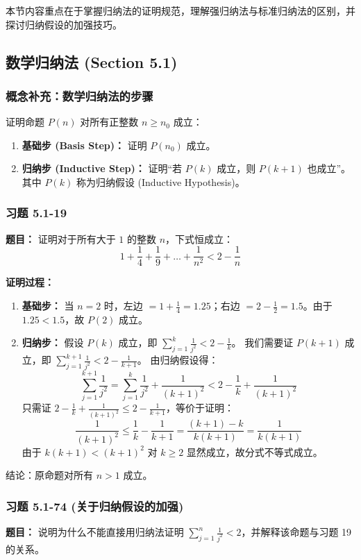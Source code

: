 \documentclass[11pt,UTF8]{article}
\begin{document}
本节内容重点在于掌握归纳法的证明规范，理解强归纳法与标准归纳法的区别，并探讨归纳假设的加强技巧。

\subsection{数学归纳法 (Section 5.1)}

\subsubsection*{概念补充：数学归纳法的步骤}
证明命题 $P(n)$ 对所有正整数 $n \ge n_0$ 成立：
\begin{enumerate}
    \item \textbf{基础步 (Basis Step)：} 证明 $P(n_0)$ 成立。
    \item \textbf{归纳步 (Inductive Step)：} 证明“若 $P(k)$ 成立，则 $P(k+1)$ 也成立”。其中 $P(k)$ 称为归纳假设 (Inductive Hypothesis)。
\end{enumerate}

\subsubsection*{习题 5.1-19}
\textbf{题目：} 证明对于所有大于 $1$ 的整数 $n$，下式恒成立：
\[ 1 + \frac{1}{4} + \frac{1}{9} + \dots + \frac{1}{n^2} < 2 - \frac{1}{n} \]

\textbf{证明过程：}
\begin{enumerate}[1.]
    \item \textbf{基础步：} 当 $n=2$ 时，左边 $= 1 + \frac{1}{4} = 1.25$；右边 $= 2 - \frac{1}{2} = 1.5$。由于 $1.25 < 1.5$，故 $P(2)$ 成立。
    \item \textbf{归纳步：} 假设 $P(k)$ 成立，即 $\sum_{j=1}^{k} \frac{1}{j^2} < 2 - \frac{1}{k}$。
    我们需要证 $P(k+1)$ 成立，即 $\sum_{j=1}^{k+1} \frac{1}{j^2} < 2 - \frac{1}{k+1}$。
    由归纳假设得：
    \[ \sum_{j=1}^{k+1} \frac{1}{j^2} = \sum_{j=1}^{k} \frac{1}{j^2} + \frac{1}{(k+1)^2} < 2 - \frac{1}{k} + \frac{1}{(k+1)^2} \]
    只需证 $2 - \frac{1}{k} + \frac{1}{(k+1)^2} \le 2 - \frac{1}{k+1}$，等价于证明：
    \[ \frac{1}{(k+1)^2} \le \frac{1}{k} - \frac{1}{k+1} = \frac{(k+1)-k}{k(k+1)} = \frac{1}{k(k+1)} \]
    由于 $k(k+1) < (k+1)^2$ 对 $k \ge 2$ 显然成立，故分式不等式成立。
\end{enumerate}
结论：原命题对所有 $n > 1$ 成立。

\subsubsection*{习题 5.1-74 (关于归纳假设的加强)}
\textbf{题目：} 说明为什么不能直接用归纳法证明 $\sum_{j=1}^{n} \frac{1}{j^2} < 2$，并解释该命题与习题 19 的关系。
\end{document}
